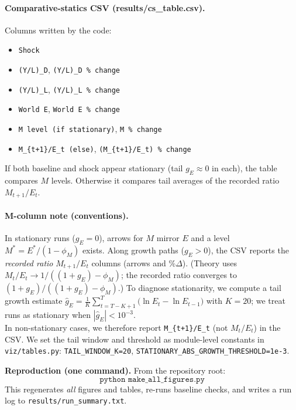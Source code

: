 \documentclass[12pt,a4paper]{article}
\newcommand{\code}[1]{\texttt{#1}}
\begin{document}
\paragraph{Comparative-statics CSV (results/cs\_table.csv).}
Columns written by the code:
\begin{itemize}[leftmargin=1.25em]
  \item \texttt{Shock}
  \item \texttt{(Y/L)\_D}, \texttt{(Y/L)\_D \% change}
  \item \texttt{(Y/L)\_L}, \texttt{(Y/L)\_L \% change}
  \item \texttt{World E}, \texttt{World E \% change}
  \item \texttt{M level (if stationary)}, \texttt{M \% change}
  \item \texttt{M\_\{t+1\}/E\_t (else)}, \texttt{(M\_\{t+1\}/E\_t) \% change}
\end{itemize}

\noindent If both baseline and shock appear stationary (tail \(g_E \approx 0\) in each), the table compares \(M\) levels. Otherwise it compares tail averages of the recorded ratio \(M_{t+1}/E_t\).

\paragraph{M-column note (conventions).}
In stationary runs ($g_E=0$), arrows for $M$ mirror $E$ and a level $M^\ast=E^\ast/(1-\phi_M)$ exists.
Along growth paths ($g_E>0$), the CSV reports the \emph{recorded ratio} \(M_{t+1}/E_t\) columns (arrows and \%\(\Delta\)). (Theory uses \(M_t/E_t \to 1/((1+g_E)-\phi_M)\); the recorded ratio converges to \((1+g_E)/((1+g_E)-\phi_M)\).) To diagnose stationarity, we compute a tail growth estimate \(\hat g_E=\frac{1}{K}\sum_{t=T-K+1}^{T}\big(\ln E_t-\ln E_{t-1}\big)\) with \(K=20\); we treat runs as stationary when \(|\hat g_E|<10^{-3}\).\\
In non-stationary cases, we therefore report \texttt{M\_\{t+1\}/E\_t} (not \(M_t/E_t\)) in the CSV.
We set the tail window and threshold as module-level constants in \code{viz/tables.py}: \code{TAIL\_WINDOW\_K=20}, \code{STATIONARY\_ABS\_GROWTH\_THRESHOLD=1e-3}.

\medskip

\begin{mdframed}[backgroundcolor=gray!08,linewidth=0.5pt]
\textbf{Reproduction (one command).} From the repository root:
\[
\code{python\ make\_all\_figures.py}
\]
This regenerates \emph{all} figures and tables, re-runs baseline checks, and writes a run log to \code{results/run\_summary.txt}.
\end{mdframed}
\end{document}
